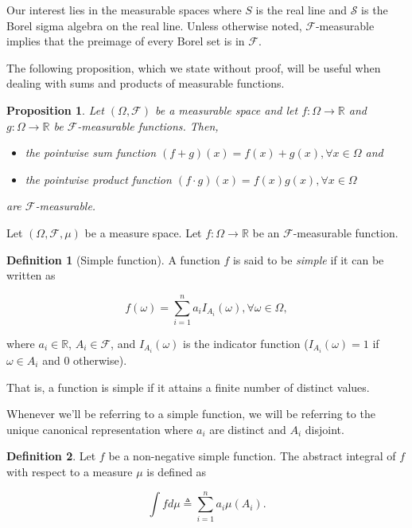 \documentclass{book}
\theoremstyle{plain}%
\newtheorem{proposition}{Proposition}[section]
\theoremstyle{definition}
\newtheorem{definition}{Definition}[section]
\newlength{\arrow}
\begin{document}
Our interest lies in the measurable spaces where $S$ is the real line and $\mathcal{S}$ is the Borel sigma algebra on the real line. Unless otherwise noted, $\mathcal{F}$-measurable implies that the preimage of every Borel set is in $\mathcal{F}$.

The following proposition, which we state without proof, will be useful when dealing with sums and products of measurable functions.

\begin{proposition}
Let $(\Omega, \mathcal{F})$ be a measurable space and let $f: \Omega \rightarrow \mathbb{R}$ and $g: \Omega \rightarrow \mathbb{R}$ be $\mathcal{F}$-measurable functions. Then,

\begin{itemize}
\item the pointwise sum function $(f+g)(x) = f(x) + g(x), \forall x \in \Omega$ and
\item the pointwise product function $(f \cdot g)(x) = f(x)g(x), \forall x \in \Omega$
\end{itemize}

are $\mathcal{F}$-measurable.
\end{proposition}

Let $(\Omega, \mathcal{F}, \mu)$ be a measure space. Let $f: \Omega \rightarrow \mathbb{R}$ be an $\mathcal{F}$-measurable function.

\begin{definition}[Simple function]
A function $f$ is said to be \emph{simple} if it can be written as

$$f(\omega) = \sum_{i=1}^n a_i I_{A_i}(\omega), \forall \omega \in \Omega,$$

where $a_i \in \mathbb{R}$, $A_i \in \mathcal{F}$, and $I_{A_i}(\omega)$ is the indicator function ($I_{A_i}(\omega) = 1$ if $\omega \in A_i$ and 0 otherwise).
\end{definition}

That is, a function is simple if it attains a finite number of distinct values.

Whenever we'll be referring to a simple function, we will be referring to the unique canonical representation where $a_i$ are distinct and $A_i$ disjoint.

\begin{definition}
Let $f$ be a non-negative simple function. The abstract integral of $f$ with respect to a measure $\mu$ is defined as

$$\int f d\mu \triangleq \sum_{i=1}^n a_i\mu(A_i).$$
\end{definition}
\end{document}
